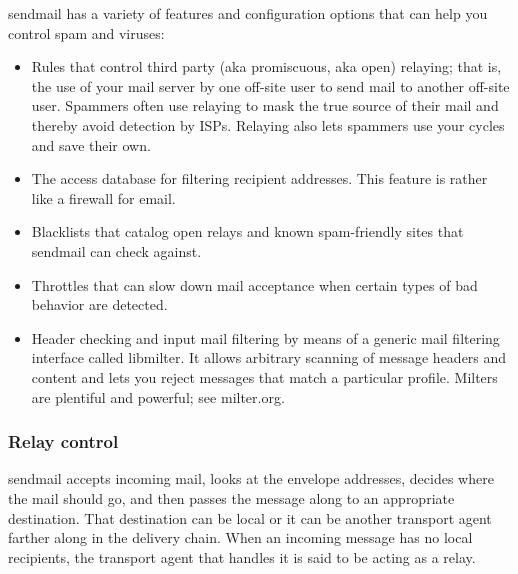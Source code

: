 {\protect\hypertarget{part0026_split_037.htmlux5cux23_idIndexMarker2559}{}{}}{sendmail}
has a variety of features and configuration options that can help you
control spam and viruses:

\begin{itemize}
\tightlist
\item
  Rules that control third party
  (\protect\hypertarget{part0026_split_037.htmlux5cux23_idIndexMarker2560}{}{}\protect\hypertarget{part0026_split_037.htmlux5cux23_idIndexMarker2561}{}{}aka
  promiscuous, aka open) relaying; that is, the use of your mail server
  by one off-site user to send mail to another off-site user. Spammers
  often use relaying to mask the true source of their mail and thereby
  avoid detection by ISPs. Relaying also lets spammers use {your} cycles
  and save their own.
\item
  The access database for filtering recipient addresses. This feature is
  rather like a firewall for email.
\item
  Blacklists that catalog open relays and known spam-friendly sites that
  {sendmail} can check against.
\item
  Throttles that can slow down mail acceptance when certain types of bad
  behavior are detected.
\item
  Header checking and input mail filtering by means of a generic mail
  filtering interface called {libmilter}. It allows arbitrary scanning
  of message headers and content and lets you reject messages that match
  a particular profile. Milters are plentiful and powerful; see
  milter.org.
\end{itemize}

\subsubsection[Relay
control]{\texorpdfstring{\protect\hypertarget{part0026_split_037.htmlux5cux23_idTextAnchor1093}{}{}Relay
control}{Relay control}}

\protect\hypertarget{part0026_split_037.htmlux5cux23_idIndexMarker2562}{}{}\protect\hypertarget{part0026_split_037.htmlux5cux23_idIndexMarker2563}{}{}{sendmail}
accepts incoming mail, looks at the envelope addresses, decides where
the mail should go, and then passes the message along to an appropriate
destination. That destination can be local or it can be another
transport agent farther along in the delivery chain. When an incoming
message has no local recipients, the transport agent that handles it is
said to be acting as a relay.

